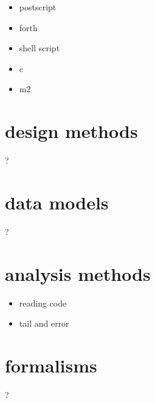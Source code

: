 \begin{itemize}
\item postscript
\item forth
\item shell script
\item c
\item m2
\end{itemize}


\section{design methods}

?

\section{data models}

?

\section{analysis methods}

\begin{itemize}
\item reading code
\item tail and error
\end{itemize}

\section{formalisms}

?